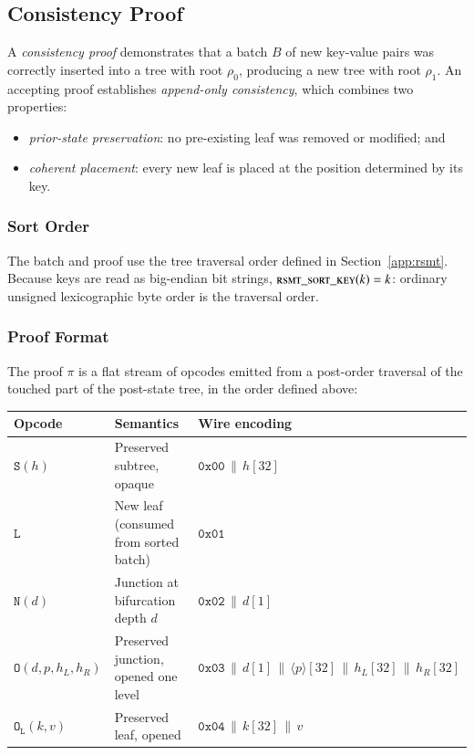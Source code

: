 \subsection{Consistency Proof}\label{sec:rsmt-consistency-proof}

A \emph{consistency proof} demonstrates that a batch $B$ of new key-value pairs was correctly inserted into a tree with root $\rho_0$, producing a new tree with root $\rho_1$. An accepting proof establishes \emph{append-only consistency}, which combines two properties:
\begin{itemize}
	\item \emph{prior-state preservation}: no pre-existing leaf was removed or modified; and
	\item \emph{coherent placement}: every new leaf is placed at the position determined by its key.
\end{itemize}


\subsubsection{Sort Order}\label{sec:rsmt-sort-order}

The batch and proof use the tree traversal order defined in Section~\ref{app:rsmt}. Because keys are read as big-endian bit strings, $\textsc{rsmt\_sort\_key}(k)=k$: ordinary unsigned lexicographic byte order is the traversal order.

\subsubsection{Proof Format}

The proof $\pi$ is a flat stream of opcodes emitted from a post-order traversal of the touched part of the post-state tree, in the order defined above:

\begin{center}
\begin{tabular}{lll}
\textbf{Opcode} & \textbf{Semantics} & \textbf{Wire encoding}  \\
\hline
$\mathtt{S}(h)$ & Preserved subtree, opaque & $\mathtt{0x00} \,\|\, h[32]$  \\
$\mathtt{L}$ & New leaf (consumed from sorted batch) & $\mathtt{0x01}$  \\
$\mathtt{N}(d)$ & Junction at bifurcation depth $d$ & $\mathtt{0x02} \,\|\, d[1]$ \\
$\mathtt{O}(d, p, h_L, h_R)$ & Preserved junction, opened one level & $\mathtt{0x03} \,\|\, d[1] \,\|\, \langle p \rangle[32] \,\|\, h_L[32] \,\|\, h_R[32]$  \\
$\mathtt{O_L}(k, v)$ & Preserved leaf, opened & $\mathtt{0x04} \,\|\, k[32] \,\|\, v$  \\
\end{tabular}
\end{center}


